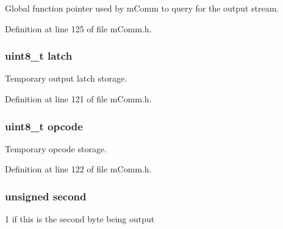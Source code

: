 Global function pointer used by m\+Comm to query for the output stream. 



Definition at line 125 of file m\+Comm.\+h.

\hypertarget{structm_comm___output_vector_a096d07a4c4a27a736c52abfd12d03345}{}
\subsubsection[{latch}]{\setlength{\rightskip}{0pt plus 5cm}uint8\+\_\+t latch}\label{structm_comm___output_vector_a096d07a4c4a27a736c52abfd12d03345}


Temporary output latch storage. 



Definition at line 121 of file m\+Comm.\+h.

\hypertarget{structm_comm___output_vector_a5c1b56e6bccc2a95dbddf1a08e56e87d}{}
\subsubsection[{opcode}]{\setlength{\rightskip}{0pt plus 5cm}uint8\+\_\+t opcode}\label{structm_comm___output_vector_a5c1b56e6bccc2a95dbddf1a08e56e87d}


Temporary opcode storage. 



Definition at line 122 of file m\+Comm.\+h.

\hypertarget{structm_comm___output_vector_af7633c5cbb76481bafd5e3e1ec07ca37}{}
\subsubsection[{second}]{\setlength{\rightskip}{0pt plus 5cm}unsigned second}\label{structm_comm___output_vector_af7633c5cbb76481bafd5e3e1ec07ca37}


\textquotesingle{}1\textquotesingle{} if this is the second byte being output 



